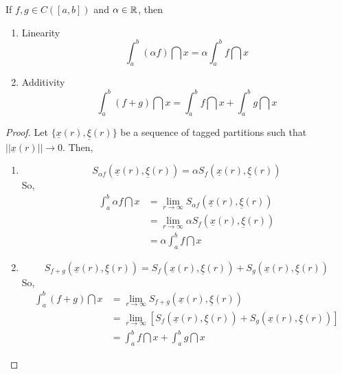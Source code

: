 \begin{theorem}
    If $f, g \in C([a,b])$ and $\alpha \in \mathbb{R}$, then
    \begin{enumerate}
        \item Linearity
            \begin{equation}
                \int_a^b (\alpha f) \dint x = \alpha \int_a^b f \dint x
            \end{equation}
        \item Additivity
            \begin{equation}
                \int_a^b (f + g)\dint x = \int_a^b f \dint x + \int_a^b g \dint x
            \end{equation}
    \end{enumerate}
\end{theorem}

\begin{proof}
     Let $\{\underline{x}(r), \underline{\xi}(r)\}$ be a sequence of tagged partitions such that $||\underline{x}(r)|| \to 0$. Then,
    \begin{enumerate}
        \item
            \begin{equation*}
                S_{\alpha f} (\underline{x}(r), \underline{\xi}(r))  = \alpha S_f(\underline{x}(r), \underline{\xi}(r))
            \end{equation*}
            So,
            \begin{align*}
                \int_a^b \alpha f \dint x &= \lim \limits_{r \to \infty} S_{\alpha f}(\underline{x}(r), \underline{\xi}(r)) \\
                &= \lim \limits_{r \to \infty} \alpha S_f(\underline{x}(r), \underline{\xi}(r)) \\
                &= \alpha \int_a^b f \dint x
            \end{align*}
        \item 
            \begin{equation*}
                S_{f + g}(\underline{x}(r), \underline{\xi}(r)) = S_f(\underline{x}(r), \underline{\xi}(r)) + S_g(\underline{x}(r), \underline{\xi}(r))
            \end{equation*}
            So,
            \begin{align*}
                \int_a^b (f+g) \dint x &= \lim \limits_{r \to \infty}S_{f + g}(\underline{x}(r), \underline{\xi}(r)) \\
                &= \lim \limits_{r \to \infty}[ S_f(\underline{x}(r), \underline{\xi}(r)) + S_g(\underline{x}(r), \underline{\xi}(r))] \\
                &= \int_a^b f \dint x + \int_a^b g \dint x
            \end{align*}
    \end{enumerate}
\end{proof}

